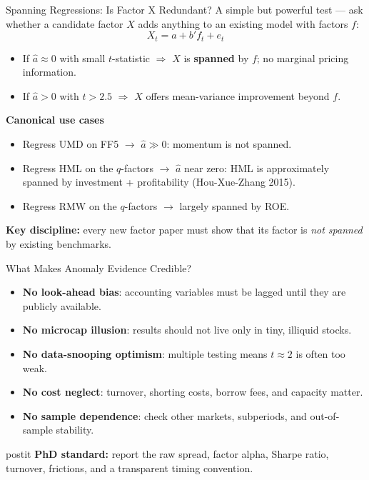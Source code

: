 \documentclass{beamer}
\begin{document}
\begin{frame}{Spanning Regressions: Is Factor X Redundant?}
	A simple but powerful test --- ask whether a candidate factor $X$ adds anything to an existing model with factors $f$:
	\begin{equation*}
		X_t = a + b' f_t + e_t
	\end{equation*}

	\begin{itemize}
		\item If $\hat a \approx 0$ with small $t$-statistic $\Rightarrow$ $X$ is \textbf{spanned} by $f$; no marginal pricing information.
		\item If $\hat a > 0$ with $t > 2.5$ $\Rightarrow$ $X$ offers mean-variance improvement beyond $f$.
	\end{itemize}

	\vspace{0.2cm}
	\textbf{Canonical use cases}
	\begin{itemize}
		\item Regress UMD on FF5 $\to$ $\hat a \gg 0$: momentum is not spanned.
		\item Regress HML on the $q$-factors $\to$ $\hat a$ near zero: HML is approximately spanned by investment + profitability (Hou-Xue-Zhang 2015).
		\item Regress RMW on the $q$-factors $\to$ largely spanned by ROE.
	\end{itemize}

	\textbf{Key discipline:} every new factor paper must show that its factor is \emph{not spanned} by existing benchmarks.
\end{frame}

\begin{frame}{What Makes Anomaly Evidence Credible?}
	\begin{itemize}
		\item \textbf{No look-ahead bias}: accounting variables must be lagged until they are publicly available.
		\item \textbf{No microcap illusion}: results should not live only in tiny, illiquid stocks.
		\item \textbf{No data-snooping optimism}: multiple testing means $t \approx 2$ is often too weak.
		\item \textbf{No cost neglect}: turnover, shorting costs, borrow fees, and capacity matter.
		\item \textbf{No sample dependence}: check other markets, subperiods, and out-of-sample stability.
	\end{itemize}

	\vspace{0.3cm}
	\begin{beamercolorbox}[sep=0.4em,wd=\linewidth,rounded=true,shadow=true]{postit}
		\textbf{PhD standard:} report the raw spread, factor alpha, Sharpe ratio, turnover, frictions, and a transparent timing convention.
	\end{beamercolorbox}
\end{frame}
\end{document}

